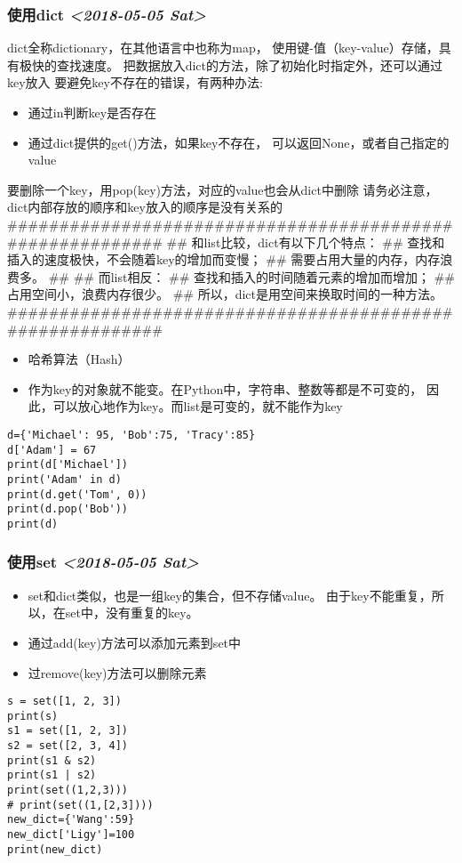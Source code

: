 \documentclass[11pt]{article}
\begin{document}
\subsubsection{使用dict \textit{<2018-05-05 Sat>}}
\label{sec:org42bc701}
dict全称dictionary，在其他语言中也称为map，
使用键-值（key-value）存储，具有极快的查找速度。
把数据放入dict的方法，除了初始化时指定外，还可以通过key放入
要避免key不存在的错误，有两种办法:
\begin{itemize}
\item 通过in判断key是否存在
\item 通过dict提供的get()方法，如果key不存在，
可以返回None，或者自己指定的value
\end{itemize}
要删除一个key，用pop(key)方法，对应的value也会从dict中删除
请务必注意，dict内部存放的顺序和key放入的顺序是没有关系的
\#\#\#\#\#\#\#\#\#\#\#\#\#\#\#\#\#\#\#\#\#\#\#\#\#\#\#\#\#\#\#\#\#\#\#\#\#\#\#\#\#\#\#\#\#\#\#\#\#\#\#\#\#\#\#\#\#\#
\#\#  和list比较，dict有以下几个特点：
\#\#  查找和插入的速度极快，不会随着key的增加而变慢；
\#\#  需要占用大量的内存，内存浪费多。
\#\#
\#\#  而list相反：
\#\#  查找和插入的时间随着元素的增加而增加；
\#\#  占用空间小，浪费内存很少。
\#\#  所以，dict是用空间来换取时间的一种方法。
\#\#\#\#\#\#\#\#\#\#\#\#\#\#\#\#\#\#\#\#\#\#\#\#\#\#\#\#\#\#\#\#\#\#\#\#\#\#\#\#\#\#\#\#\#\#\#\#\#\#\#\#\#\#\#\#\#\#
\begin{itemize}
\item 哈希算法（Hash）
\item 作为key的对象就不能变。在Python中，字符串、整数等都是不可变的，
因此，可以放心地作为key。而list是可变的，就不能作为key
\end{itemize}
\begin{verbatim}
d={'Michael': 95, 'Bob':75, 'Tracy':85}
d['Adam'] = 67
print(d['Michael'])
print('Adam' in d)
print(d.get('Tom', 0))
print(d.pop('Bob'))
print(d)
\end{verbatim}
\subsubsection{使用set \textit{<2018-05-05 Sat>}}
\label{sec:org8f13606}
\begin{itemize}
\item set和dict类似，也是一组key的集合，但不存储value。
由于key不能重复，所以，在set中，没有重复的key。
\item 通过add(key)方法可以添加元素到set中
\item 过remove(key)方法可以删除元素
\end{itemize}
\begin{verbatim}
s = set([1, 2, 3])
print(s)
s1 = set([1, 2, 3])
s2 = set([2, 3, 4])
print(s1 & s2)
print(s1 | s2)
print(set((1,2,3)))
# print(set((1,[2,3])))
new_dict={'Wang':59}
new_dict['Ligy']=100
print(new_dict)
\end{verbatim}
\end{document}
